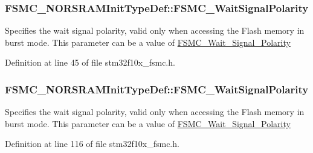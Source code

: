 \subsubsection[{\texorpdfstring{F\+S\+M\+C\+\_\+\+Wait\+Signal\+Polarity}{FSMC_WaitSignalPolarity}}]{ F\+S\+M\+C\+\_\+\+N\+O\+R\+S\+R\+A\+M\+Init\+Type\+Def\+::\+F\+S\+M\+C\+\_\+\+Wait\+Signal\+Polarity}\hypertarget{struct_f_s_m_c___n_o_r_s_r_a_m_init_type_def_ae402362e2f99344e1b1f8bf7259f4669}{}\label{struct_f_s_m_c___n_o_r_s_r_a_m_init_type_def_ae402362e2f99344e1b1f8bf7259f4669}
Specifies the wait signal polarity, valid only when accessing the Flash memory in burst mode. This parameter can be a value of \hyperlink{group___f_s_m_c___wait___signal___polarity}{F\+S\+M\+C\+\_\+\+Wait\+\_\+\+Signal\+\_\+\+Polarity} 

Definition at line 45 of file stm32f10x\+\_\+fsmc.\+h.

\subsubsection[{\texorpdfstring{F\+S\+M\+C\+\_\+\+Wait\+Signal\+Polarity}{FSMC_WaitSignalPolarity}}]{ F\+S\+M\+C\+\_\+\+N\+O\+R\+S\+R\+A\+M\+Init\+Type\+Def\+::\+F\+S\+M\+C\+\_\+\+Wait\+Signal\+Polarity}\hypertarget{struct_f_s_m_c___n_o_r_s_r_a_m_init_type_def_a5d4d76594fc201943b51095e3ef34791}{}\label{struct_f_s_m_c___n_o_r_s_r_a_m_init_type_def_a5d4d76594fc201943b51095e3ef34791}
Specifies the wait signal polarity, valid only when accessing the Flash memory in burst mode. This parameter can be a value of \hyperlink{group___f_s_m_c___wait___signal___polarity}{F\+S\+M\+C\+\_\+\+Wait\+\_\+\+Signal\+\_\+\+Polarity} 

Definition at line 116 of file stm32f10x\+\_\+fsmc.\+h.

